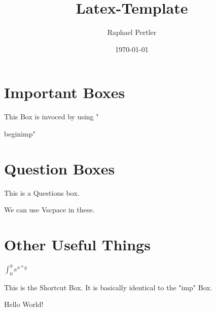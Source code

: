 \documentclass[twocolumn]{article}
\title{\textbf{Latex-Template}}
\author{ Raphael Pertler }
\date{\today}
\begin{document}
\maketitle

\section*{Important Boxes}

\begin{imp}
  This Box is invoced by using "

  begin{imp}"
\end{imp}

\section*{Question Boxes}

\begin{question}

  This is a Questions box.

  We can use Vscpace in these.
  \vspace{1cm}
\end{question}

\section*{Other Useful Things}

$\boxed{\int_{0}^{y} e^{x*y}}$

\begin{shortcut}
  This is the Shortcut Box.
  It is basically identical to the "imp" Box.
\end{shortcut}
Hello World!
\end{document}
